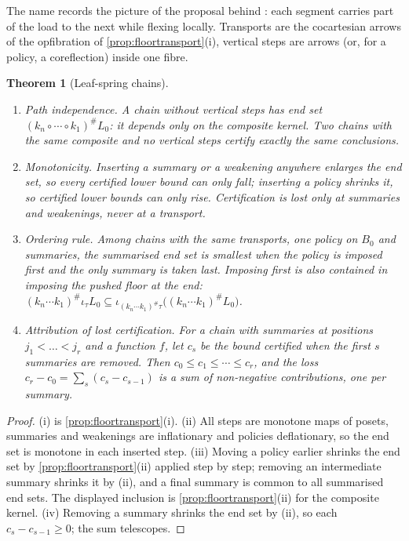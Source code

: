 \documentclass[11pt]{article}
\newtheorem{theorem}{Theorem}[section]
\theoremstyle{definition}
\theoremstyle{remark}
\begin{document}
The name records the picture of the proposal behind \cite[Section~14]{Awasthi-Validation}: each segment carries part of the load to the
next while flexing locally. Transports are the cocartesian arrows of the opfibration of \cref{prop:floortransport}(i), vertical steps
are arrows (or, for a policy, a coreflection) inside one fibre.

\begin{theorem}[Leaf-spring chains]\label{thm:leafspring}
\leavevmode
\begin{enumerate}[label=(\roman*)]
\item \emph{Path independence.} A chain without vertical steps has end set $(k_n\circ\cdots\circ k_1)^\#L_0$: it depends only on
  the composite kernel. Two chains with the same composite and no vertical steps certify exactly the same conclusions.
\item \emph{Monotonicity.} Inserting a summary or a weakening anywhere enlarges the end set, so every certified lower bound can
  only fall; inserting a policy shrinks it, so certified lower bounds can only rise. Certification is lost only at summaries and
  weakenings, never at a transport.
\item \emph{Ordering rule.} Among chains with the same transports, one policy on $B_0$ and summaries, the summarised end set is
  smallest when the policy is imposed first and the only summary is taken last. Imposing first is also contained in imposing the
  pushed floor at the end: $(k_n\cdots k_1)^\#\iota_\tau L_0\subseteq\iota_{(k_n\cdots k_1)^\#\tau}\big((k_n\cdots k_1)^\#L_0\big)$.
\item \emph{Attribution of lost certification.} For a chain with summaries at positions $j_1<\dots<j_r$ and a function $f$, let
  $c_s$ be the bound certified when the first $s$ summaries are removed. Then $c_0\le c_1\le\cdots\le c_r$, and the loss
  $c_r-c_0=\sum_s(c_s-c_{s-1})$ is a sum of non-negative contributions, one per summary.
\end{enumerate}
\end{theorem}
\begin{proof}
(i) is \cref{prop:floortransport}(i). (ii) All steps are monotone maps of posets, summaries and weakenings are inflationary and
policies deflationary, so the end set is monotone in each inserted step. (iii) Moving a policy earlier shrinks the end set by
\cref{prop:floortransport}(ii) applied step by step; removing an intermediate summary shrinks it by (ii), and a final summary is
common to all summarised end sets. The displayed inclusion is \cref{prop:floortransport}(ii) for the composite kernel.
(iv) Removing a summary shrinks the end set by (ii), so each $c_s-c_{s-1}\ge0$; the sum telescopes.
\end{proof}
\end{document}
